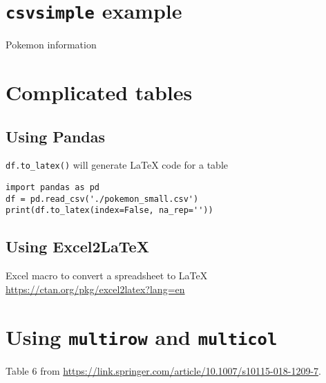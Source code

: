 \documentclass{article}
\begin{document}
\newpage
\section{{\tt csvsimple} example}

\begin{table}[htb]
    \centering
    \caption{Pokemon information}
    \label{tab:pokemon}
    \vspace{0.1in}
\end{table}
\newpage

\section{Complicated tables}

\subsection{Using Pandas}
{\tt df.to\_latex()} will generate \LaTeX{} code for a table

\begin{verbatim}
import pandas as pd
df = pd.read_csv('./pokemon_small.csv')
print(df.to_latex(index=False, na_rep=''))
\end{verbatim}



\subsection{Using Excel2LaTeX}
Excel macro to convert a spreadsheet to \LaTeX{} \url{https://ctan.org/pkg/excel2latex?lang=en} 

\newpage
\section{Using {\tt multirow} and {\tt multicol}}
Table 6 from \url{https://link.springer.com/article/10.1007/s10115-018-1209-7}.
\end{document}
